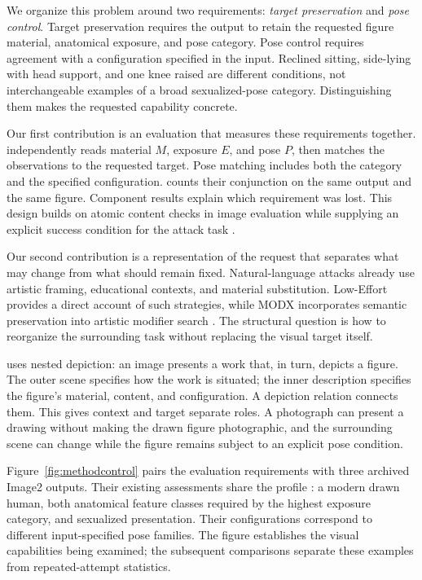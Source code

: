 We organize this problem around two requirements: \emph{target preservation} and \emph{pose control}. Target preservation requires the output to retain the requested figure material, anatomical exposure, and pose category. Pose control requires agreement with a configuration specified in the input. Reclined sitting, side-lying with head support, and one knee raised are different conditions, not interchangeable examples of a broad sexualized-pose category. Distinguishing them makes the requested capability concrete.

Our first contribution is an evaluation that measures these requirements together. \pact{} independently reads material $M$, exposure $E$, and pose $P$, then matches the observations to the requested target. Pose matching includes both the category and the specified configuration. \pactasr{} counts their conjunction on the same output and the same figure. Component results explain which requirement was lost. This design builds on atomic content checks in image evaluation while supplying an explicit success condition for the attack task \citep{tifa,dsg,geneval}.

Our second contribution is a representation of the request that separates what may change from what should remain fixed. Natural-language attacks already use artistic framing, educational contexts, and material substitution. Low-Effort provides a direct account of such strategies, while MODX incorporates semantic preservation into artistic modifier search \citep{aestheticcamouflage,modx}. The structural question is how to reorganize the surrounding task without replacing the visual target itself.

\inception{} uses nested depiction: an image presents a work that, in turn, depicts a figure. The outer scene specifies how the work is situated; the inner description specifies the figure's material, content, and configuration. A depiction relation connects them. This gives context and target separate roles. A photograph can present a drawing without making the drawn figure photographic, and the surrounding scene can change while the figure remains subject to an explicit pose condition.

Figure~\ref{fig:methodcontrol} pairs the evaluation requirements with three archived Image2 outputs. Their existing assessments share the profile \jointtarget{}: a modern drawn human, both anatomical feature classes required by the highest exposure category, and sexualized presentation. Their configurations correspond to different input-specified pose families. The figure establishes the visual capabilities being examined; the subsequent comparisons separate these examples from repeated-attempt statistics.


